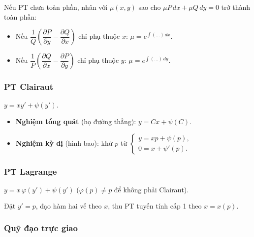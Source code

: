 \documentclass[12pt,a4paper]{article}
\begin{document}
\begin{phuongphap}[title={Thừa số tích phân}]
  Nếu PT chưa toàn phần, nhân với $\mu(x,y)$ sao cho $\mu P\,dx + \mu Q\,dy = 0$ trở thành toàn phần:
  \begin{itemize}
    \item Nếu $\dfrac{1}{Q}\!\left(\dfrac{\partial P}{\partial y} - \dfrac{\partial Q}{\partial x}\right)$ chỉ phụ thuộc $x$: $\mu = e^{\int (\ldots)\,dx}$.
    \item Nếu $\dfrac{1}{P}\!\left(\dfrac{\partial Q}{\partial x} - \dfrac{\partial P}{\partial y}\right)$ chỉ phụ thuộc $y$: $\mu = e^{\int (\ldots)\,dy}$.
  \end{itemize}
\end{phuongphap}

\subsubsection{PT Clairaut}

\begin{dinhnghia}
  $y = xy' + \psi(y')$.
\end{dinhnghia}

\begin{congthuc}
  \begin{itemize}
    \item \textbf{Nghiệm tổng quát} (họ đường thẳng): $y = Cx + \psi(C)$.
    \item \textbf{Nghiệm kỳ dị} (hình bao): khử $p$ từ $\begin{cases} y = xp + \psi(p), \\ 0 = x + \psi'(p). \end{cases}$
  \end{itemize}
\end{congthuc}

\subsubsection{PT Lagrange}

\begin{dinhnghia}
  $y = x\,\varphi(y') + \psi(y')$ \quad ($\varphi(p) \ne p$ để không phải Clairaut).
\end{dinhnghia}

\begin{phuongphap}
  Đặt $y' = p$, đạo hàm hai vế theo $x$, thu PT tuyến tính cấp 1 theo $x = x(p)$.
\end{phuongphap}

\subsubsection{Quỹ đạo trực giao}
\end{document}
